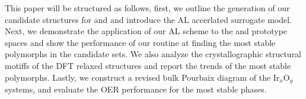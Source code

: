 
%
%
This paper will be structured as follows,
first, we outline the generation of our candidate structures for \IrOtwo and \IrOthree and introduce the AL accerlated surrogate model.
%
Next, we demonstrate the application of our AL scheme to the \IrOtwo and \IrOthree prototype spaces and show the performance of our routine at finding the most stable polymorphs in the candidate sets.
%
We also analyze the crystallographic structural motiffs of the DFT relaxed structures and report the trends of the most stable polymorphs.
%
Lastly, we construct a revised bulk Pourbaix diagram of the Ir$_x$O$_y$ systems, and evaluate the OER performance for the most stable phases.
%








%


